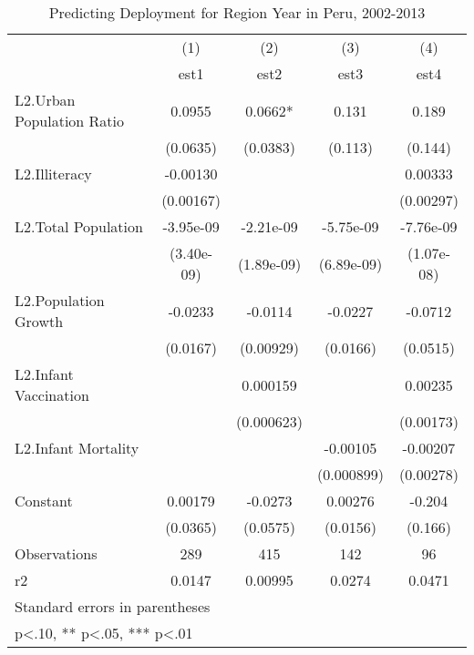 \documentclass[12pt]{article}
\begin{document}
\begin{doublespace}
\begin{table}[htbp]\centering
\def\sym#1{\ifmmode^{#1}\else\(^{#1}\)\fi}
\caption{Predicting Deployment for Region Year in Peru, 2002-2013}
\begin{tabular}{l*{4}{c}}
\hline\hline
                    &\multicolumn{1}{c}{(1)}&\multicolumn{1}{c}{(2)}&\multicolumn{1}{c}{(3)}&\multicolumn{1}{c}{(4)}\\
                    &\multicolumn{1}{c}{est1}&\multicolumn{1}{c}{est2}&\multicolumn{1}{c}{est3}&\multicolumn{1}{c}{est4}\\
\hline
L2.Urban Population Ratio&      0.0955   &      0.0662*  &       0.131   &       0.189   \\
                    &    (0.0635)   &    (0.0383)   &     (0.113)   &     (0.144)   \\
[1em]
L2.Illiteracy       &    -0.00130   &               &               &     0.00333   \\
                    &   (0.00167)   &               &               &   (0.00297)   \\
[1em]
L2.Total Population &   -3.95e-09   &   -2.21e-09   &   -5.75e-09   &   -7.76e-09   \\
                    &  (3.40e-09)   &  (1.89e-09)   &  (6.89e-09)   &  (1.07e-08)   \\
[1em]
L2.Population Growth&     -0.0233   &     -0.0114   &     -0.0227   &     -0.0712   \\
                    &    (0.0167)   &   (0.00929)   &    (0.0166)   &    (0.0515)   \\
[1em]
L2.Infant Vaccination&               &    0.000159   &               &     0.00235   \\
                    &               &  (0.000623)   &               &   (0.00173)   \\
[1em]
L2.Infant Mortality &               &               &    -0.00105   &    -0.00207   \\
                    &               &               &  (0.000899)   &   (0.00278)   \\
[1em]
Constant            &     0.00179   &     -0.0273   &     0.00276   &      -0.204   \\
                    &    (0.0365)   &    (0.0575)   &    (0.0156)   &     (0.166)   \\
\hline
Observations        &         289   &         415   &         142   &          96   \\
r2                  &      0.0147   &     0.00995   &      0.0274   &      0.0471   \\
\hline\hline
\multicolumn{5}{l}{\footnotesize Standard errors in parentheses}\\
\multicolumn{5}{l}{\footnotesize * p<.10, ** p<.05, *** p<.01}\\
\end{tabular}
\end{table}



\end{doublespace}
\end{document}
